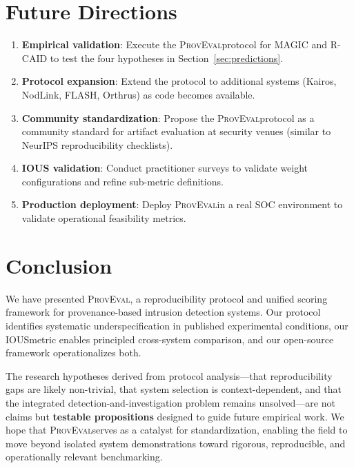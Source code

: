 \documentclass[11pt,a4paper]{article}
\newcommand{\ious}{\textsc{IOUS}}
\newcommand{\proveval}{\textsc{ProvEval}}
\begin{document}
\section{Future Directions}
\label{sec:future}

\begin{enumerate}[leftmargin=*]
    \item \textbf{Empirical validation}: Execute the \proveval protocol for MAGIC and R-CAID to test the four hypotheses in Section~\ref{sec:predictions}.

    \item \textbf{Protocol expansion}: Extend the protocol to additional systems (Kairos, NodLink, FLASH, Orthrus) as code becomes available.

    \item \textbf{Community standardization}: Propose the \proveval protocol as a community standard for artifact evaluation at security venues (similar to NeurIPS reproducibility checklists).

    \item \textbf{IOUS validation}: Conduct practitioner surveys to validate weight configurations and refine sub-metric definitions.

    \item \textbf{Production deployment}: Deploy \proveval in a real SOC environment to validate operational feasibility metrics.
\end{enumerate}

\section{Conclusion}
\label{sec:conclusion}

We have presented \proveval, a reproducibility protocol and unified scoring framework for provenance-based intrusion detection systems. Our protocol identifies systematic underspecification in published experimental conditions, our \ious metric enables principled cross-system comparison, and our open-source framework operationalizes both.

The research hypotheses derived from protocol analysis---that reproducibility gaps are likely non-trivial, that system selection is context-dependent, and that the integrated detection-and-investigation problem remains unsolved---are not claims but \textbf{testable propositions} designed to guide future empirical work. We hope that \proveval serves as a catalyst for standardization, enabling the field to move beyond isolated system demonstrations toward rigorous, reproducible, and operationally relevant benchmarking.
\end{document}
